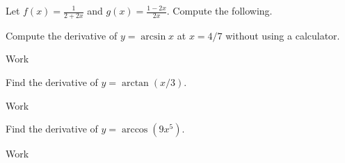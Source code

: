 \documentclass[12pt,addpoints, answers, fleqn]{exam}
\begin{document}
\begin{teacher}
\begin{questions}
\question 	%

Let $f\left(x\right) = \displaystyle \frac{1}{2+2x}$ and $g\left(x\right) = \displaystyle \frac{1-2x}{2x}$. Compute the following.

\question 	%

Compute the derivative of $y = \arcsin x$ at $x = 4/7$ without using a calculator.
\begin{solution}
Work
\end{solution}
\question 	%

Find the derivative of $y = \arctan \left(x/3\right)$.
\begin{solution}
Work
\end{solution}

\question 	%

Find the derivative of $y = \arccos \left( 9x^5\right)$.
\begin{solution}
Work
\end{solution}

\question 	%


\end{questions}
\end{teacher}
\end{document}
